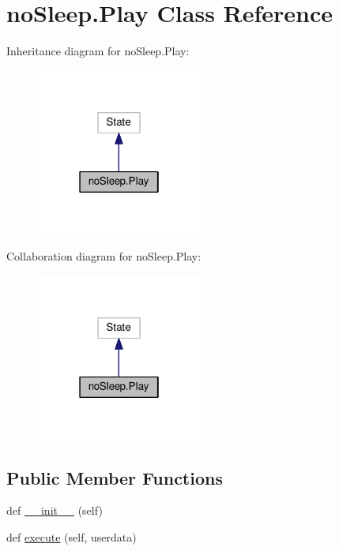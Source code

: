 \hypertarget{classnoSleep_1_1Play}{}\section{no\+Sleep.\+Play Class Reference}
\label{classnoSleep_1_1Play}


Inheritance diagram for no\+Sleep.\+Play\+:
\nopagebreak
\begin{figure}[H]
\begin{center}
\leavevmode
\includegraphics[width=154pt]{classnoSleep_1_1Play__inherit__graph}
\end{center}
\end{figure}


Collaboration diagram for no\+Sleep.\+Play\+:
\nopagebreak
\begin{figure}[H]
\begin{center}
\leavevmode
\includegraphics[width=154pt]{classnoSleep_1_1Play__coll__graph}
\end{center}
\end{figure}
\subsection*{Public Member Functions}
\begin{DoxyCompactItemize}
\item 
def \hyperlink{classnoSleep_1_1Play_a587a6f6981b7b8b741ffba66fbad8ded}{\+\_\+\+\_\+init\+\_\+\+\_\+} (self)
\item 
def \hyperlink{classnoSleep_1_1Play_ab0ab4ba67c0feb27958d4f6655f9e104}{execute} (self, userdata)
\end{DoxyCompactItemize}
